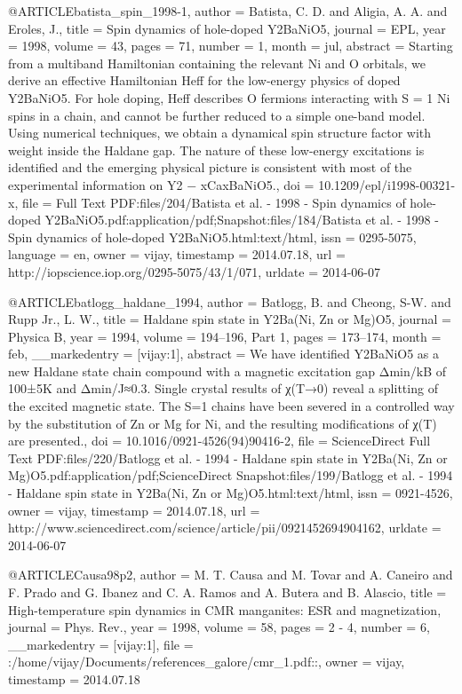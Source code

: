 @ARTICLE{batista_spin_1998-1,
  author = {Batista, C. D. and Aligia, A. A. and Eroles, J.},
  title = {Spin dynamics of hole-doped Y2BaNiO5},
  journal = {{EPL}},
  year = {1998},
  volume = {43},
  pages = {71},
  number = {1},
  month = jul,
  abstract = {Starting from a multiband Hamiltonian containing the relevant Ni and
	O orbitals, we derive an effective Hamiltonian Heff for the low-energy
	physics of doped Y2BaNiO5. For hole doping, Heff describes O fermions
	interacting with S = 1 Ni spins in a chain, and cannot be further
	reduced to a simple one-band model. Using numerical techniques, we
	obtain a dynamical spin structure factor with weight inside the Haldane
	gap. The nature of these low-energy excitations is identified and
	the emerging physical picture is consistent with most of the experimental
	information on Y2 − {xCaxBaNiO}5.},
  doi = {10.1209/epl/i1998-00321-x},
  file = {Full Text PDF:files/204/Batista et al. - 1998 - Spin dynamics of hole-doped Y2BaNiO5.pdf:application/pdf;Snapshot:files/184/Batista et al. - 1998 - Spin dynamics of hole-doped Y2BaNiO5.html:text/html},
  issn = {0295-5075},
  language = {en},
  owner = {vijay},
  timestamp = {2014.07.18},
  url = {http://iopscience.iop.org/0295-5075/43/1/071},
  urldate = {2014-06-07}
}

@ARTICLE{batlogg_haldane_1994,
  author = {Batlogg, B. and Cheong, S-W. and Rupp Jr., L. W.},
  title = {Haldane spin state in Y2Ba(Ni, Zn or Mg)O5},
  journal = {Physica B},
  year = {1994},
  volume = {194--196, Part 1},
  pages = {173--174},
  month = feb,
  __markedentry = {[vijay:1]},
  abstract = {We have identified Y2BaNiO5 as a new Haldane state chain compound
	with a magnetic excitation gap Δmin/{kB} of 100±5K and Δmin/{\textbar}J{\textbar}≈0.3.
	Single crystal results of χ(T→0) reveal a splitting of the excited
	magnetic state. The S=1 chains have been severed in a controlled
	way by the substitution of Zn or Mg for Ni, and the resulting modifications
	of χ(T) are presented.},
  doi = {10.1016/0921-4526(94)90416-2},
  file = {ScienceDirect Full Text PDF:files/220/Batlogg et al. - 1994 - Haldane spin state in Y2Ba(Ni, Zn or Mg)O5.pdf:application/pdf;ScienceDirect Snapshot:files/199/Batlogg et al. - 1994 - Haldane spin state in Y2Ba(Ni, Zn or Mg)O5.html:text/html},
  issn = {0921-4526},
  owner = {vijay},
  timestamp = {2014.07.18},
  url = {http://www.sciencedirect.com/science/article/pii/0921452694904162},
  urldate = {2014-06-07}
}

@ARTICLE{Causa98p2,
  author = {M. T. Causa and M. Tovar and A. Caneiro and F. Prado and G. Ibanez
	and C. A. Ramos and A. Butera and B. Alascio},
  title = {High-temperature spin dynamics in CMR manganites: ESR and magnetization},
  journal = {Phys. Rev.},
  year = {1998},
  volume = {58},
  pages = {2 - 4},
  number = {6},
  __markedentry = {[vijay:1]},
  file = {:/home/vijay/Documents/references_galore/cmr_1.pdf::},
  owner = {vijay},
  timestamp = {2014.07.18}
}

